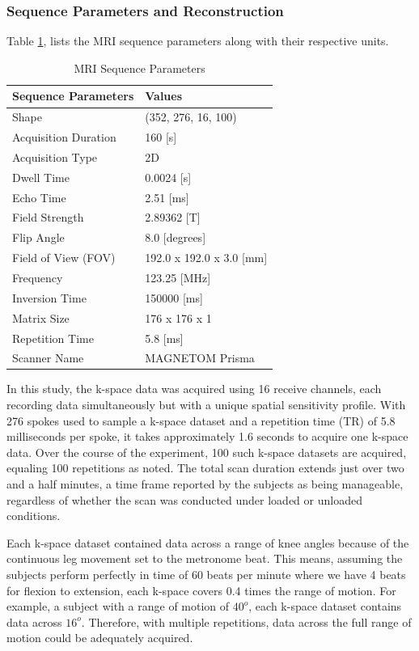 \documentclass{micro-econ-thesis}
\begin{document}
\subsubsection{Sequence Parameters and Reconstruction}
Table \ref{tab:mri_seq_params}, lists the MRI sequence parameters along with their respective units.

\begin{table}[H]
	\centering
	\label{tab:mri_seq_params}
	\caption{MRI Sequence Parameters}
	\begin{tabular}{@{}ll@{}}
		\toprule
		Sequence Parameters & Values \\ \midrule
		Shape & (352, 276, 16, 100) \\
		Acquisition Duration & 160 [s] \\
		Acquisition Type & 2D \\
		Dwell Time & 0.0024 [s] \\
		Echo Time & 2.51 [ms] \\
		Field Strength & 2.89362 [T] \\
		Flip Angle & 8.0 [degrees] \\
		Field of View (FOV) & 192.0 x 192.0 x 3.0 [mm] \\
		Frequency & 123.25 [MHz] \\
		Inversion Time & 150000 [ms] \\
		Matrix Size & 176 x 176 x 1 \\
		Repetition Time & 5.8 [ms] \\
		Scanner Name & MAGNETOM Prisma \\
		\bottomrule
	\end{tabular}
\end{table}

In this study, the k-space data was acquired using 16 receive channels, each recording data simultaneously but with a unique spatial sensitivity profile. With 276 spokes used to sample a k-space dataset and a repetition time (TR) of 5.8 milliseconds per spoke, it takes approximately 1.6 seconds to acquire one k-space data. Over the course of the experiment, 100 such k-space datasets are acquired, equaling 100 repetitions as noted. The total scan duration extends just over two and a half minutes, a time frame reported by the subjects as being manageable, regardless of whether the scan was conducted under loaded or unloaded conditions.

Each k-space dataset contained data across a range of knee angles because of the continuous leg movement set to the metronome beat. This means, assuming the subjects perform perfectly in time of 60 beats per minute where we have 4 beats for flexion to extension, each k-space covers 0.4 times the range of motion. For example, a subject with a range of motion of $40^o$, each k-space dataset contains data across $16^o$. Therefore, with multiple repetitions, data across the full range of motion could be adequately acquired.     
 
\end{document}
